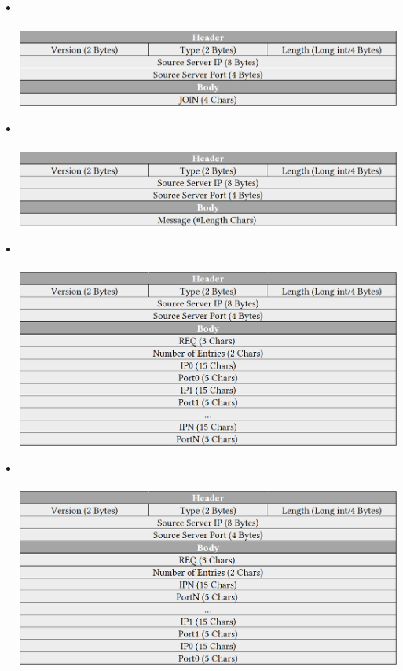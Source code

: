 \documentclass{article}
\begin{document}
\begin{itemize}
	\item {}\\\\
		\includegraphics{Join}
	\item {}\\\\
		\includegraphics{Message}
	\item {}\\\\
		\includegraphics{ReunionHello}	
\newpage
	\item {}\\\\
		\includegraphics{ReunionHelloBack}	
\end{itemize}
\end{document}
